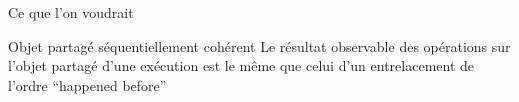 \begin{frame}[fragile]{Ce que l'on voudrait}
  \begin{block}{Objet partagé séquentiellement cohérent}
    Le résultat observable \alert{des opérations sur l'objet partagé}
    d'une exécution est le même que celui d'un entrelacement de l'ordre ``happened before''
  \end{block}

  

\end{frame}

\endgroup
\endinput
